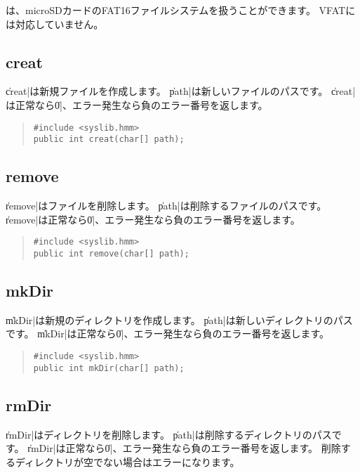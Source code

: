 \tacos は、microSDカードのFAT16ファイルシステムを扱うことができます。
VFATには対応していません。

\subsection{creat}

\|creat|は新規ファイルを作成します。
\|path|は新しいファイルのパスです。
\|creat|は正常なら\|0|、エラー発生なら負のエラー番号を返します。

\begin{quote}
\begin{verbatim}
#include <syslib.hmm>
public int creat(char[] path);
\end{verbatim}
\end{quote}

\subsection{remove}

\|remove|はファイルを削除します。
\|path|は削除するファイルのパスです。
\|remove|は正常なら\|0|、エラー発生なら負のエラー番号を返します。

\begin{quote}
\begin{verbatim}
#include <syslib.hmm>
public int remove(char[] path);
\end{verbatim}
\end{quote}

\subsection{mkDir}

\|mkDir|は新規のディレクトリを作成します。
\|path|は新しいディレクトリのパスです。
\|mkDir|は正常なら\|0|、エラー発生なら負のエラー番号を返します。

\begin{quote}
\begin{verbatim}
#include <syslib.hmm>
public int mkDir(char[] path);
\end{verbatim}
\end{quote}

\subsection{rmDir}

\|rmDir|はディレクトリを削除します。
\|path|は削除するディレクトリのパスです。
\|rmDir|は正常なら\|0|、エラー発生なら負のエラー番号を返します。
削除するディレクトリが空でない場合はエラーになります。

